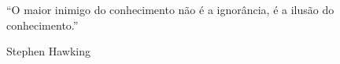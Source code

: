 

\begin{flushright}
\begin{minipage}[r]{10cm}
\vspace{18cm}
``O maior inimigo do conhecimento não é a ignorância, é a ilusão do conhecimento.''
\begin{flushright}
 Stephen Hawking
\end{flushright}
\end{minipage}
\end{flushright}